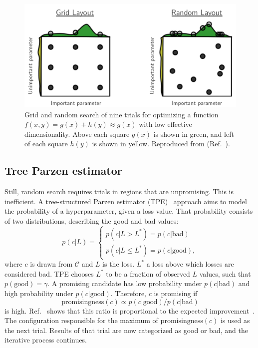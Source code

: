 \begin{figure}
    \includegraphics[width=\linewidth]{images/gridrandsearch.png}
    \caption[Grid and random search]{
        Grid and random search of nine trials for optimizing a function $f(x, y) = g(x) + h(y) \approx g(x)$ with low effective dimensionality.
        Above each square $g(x)$ is shown in green, and left of each square $h(y)$ is shown in yellow.
        Reproduced from  (Ref.~\cite{Bergstra2012}).
    }
    \label{fig:gridrandsearch}
\end{figure}

\subsection{Tree Parzen estimator}
Still, random search requires trials in regions that are unpromising.
This is inefficient.
A tree-structured Parzen estimator (TPE)~\cite{Bergstra2011} approach aims to model the probability of a hyperparameter, given a loss value.
That probability consists of two distributions, describing the good and bad values:
\begin{equation}
    p(c|L) =
    \begin{cases}
        p(c|L > L^*) = p(c|\mathrm{bad}) \\
        p(c|L \leq L^*) = p(c|\mathrm{good}),
    \end{cases}
\end{equation}
where $c$ is drawn from $\mathcal{C}$ and $L$ is the loss.
$L^*$ a loss above which losses are considered bad.
TPE chooses $L^*$ to be a fraction of observed $L$ values, such that $p(\mathrm{good}) = \gamma$.
A promising candidate has low probability under $p(c|\mathrm{bad})$ and high probability under $p(c|\mathrm{good})$.
Therefore, $c$ is promising if
\begin{equation}
    \mathrm{promisingness}(c) \propto p(c|\mathrm{good}) / p(c|\mathrm{bad})
\end{equation}
is high.
Ref.~\cite{Bergstra2011} shows that this ratio is proportional to the expected improvement~\cite{Jones2001}.
The configuration responsible for the maximum of $\mathrm{promisingness}(c)$ is used as the next trial.
Results of that trial are now categorized as good or bad, and the iterative process continues.


